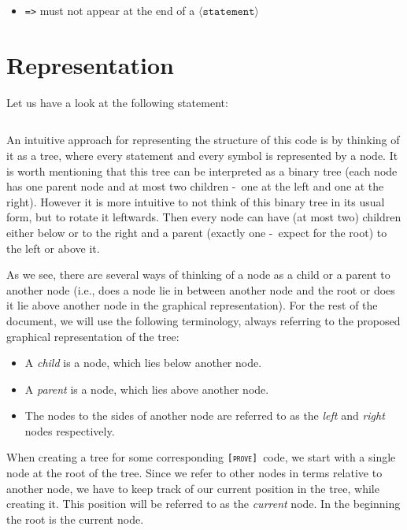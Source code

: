 \documentclass[british]{article}
\newenvironment{code}{\captionsetup{type=listing}}{}
\newcommand\prv{bc}
\newcommand\m[1]{\texttt{#1}}
\newcommand\name{\texttt{\textsc{[prove]}}}
\begin{document}
\begin{itemize}
\item \m{=>} must not appear at the end of a $\langle\texttt{statement}\rangle$
\end{itemize}
\pagebreak{}

\section{Representation}

Let us have a look at the following statement:

\begin{code}
\label{code:ex1}
\inputminted[linenos]{\prv}{examples/exmp1.prove}
\end{code}

An intuitive approach for representing the structure of this code is by thinking
of it as a tree, where every statement and every symbol is represented by a
node. It is worth mentioning that this tree can be interpreted as a binary tree
(each node has one parent node and at most two children -\ one at the left and
one at the right). However it is more intuitive to not think of this binary tree
in its usual form, but to rotate it leftwards. Then every node can have (at most
two) children either below or to the right and a parent (exactly one -\ expect
for the root) to the left or above it.

As we see, there are several ways of thinking of a node as a child or a parent
to another node (i.e., does a node lie in between another node and the root or
does it lie above another node in the graphical representation). For the rest of
the document, we will use the following terminology, always referring to the
proposed graphical representation of the tree:

\begin{itemize}
	\item
		A \emph{child} is a node, which lies below another node.
	\item
		A \emph{parent} is a node, which lies above another node.
	\item
		The nodes to the sides of another node are referred to as the
		\emph{left} and \emph{right} nodes respectively.
\end{itemize}

When creating a tree for some corresponding \name\ code, we start with a single
node at the root of the tree. Since we refer to other nodes in terms relative to
another node, we have to keep track of our current position in the tree, while
creating it. This position will be referred to as the \emph{current} node. In
the beginning the root is the current node.
\end{document}
